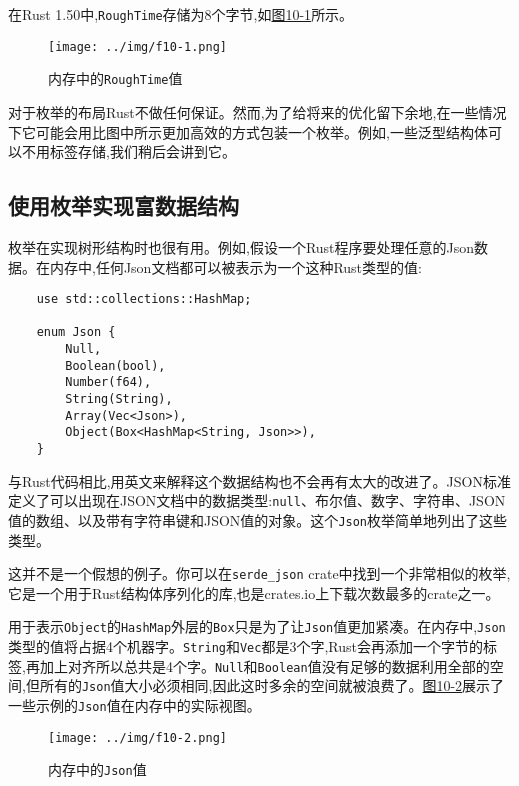 在Rust 1.50中,\texttt{RoughTime}存储为8个字节,如\hyperref[f10-1]{图10-1}所示。

\begin{figure}[htbp]
    \centering
    \texttt{[image: ../img/f10-1.png]}
    \caption{内存中的\texttt{RoughTime}值}
    \label{f10-1}
\end{figure}

对于枚举的布局Rust不做任何保证。然而,为了给将来的优化留下余地,在一些情况下它可能会用比图中所示更加高效的方式包装一个枚举。例如,一些泛型结构体可以不用标签存储,我们稍后会讲到它。

\subsection{使用枚举实现富数据结构}

枚举在实现树形结构时也很有用。例如,假设一个Rust程序要处理任意的Json数据。在内存中,任何Json文档都可以被表示为一个这种Rust类型的值:
\begin{verbatim}
    use std::collections::HashMap;

    enum Json {
        Null,
        Boolean(bool),
        Number(f64),
        String(String),
        Array(Vec<Json>),
        Object(Box<HashMap<String, Json>>),
    }
\end{verbatim}

与Rust代码相比,用英文来解释这个数据结构也不会再有太大的改进了。JSON标准定义了可以出现在JSON文档中的数据类型:\texttt{null}、布尔值、数字、字符串、JSON值的数组、以及带有字符串键和JSON值的对象。这个\texttt{Json}枚举简单地列出了这些类型。

这并不是一个假想的例子。你可以在\texttt{serde\_json} crate中找到一个非常相似的枚举,它是一个用于Rust结构体序列化的库,也是crates.io上下载次数最多的crate之一。

用于表示\texttt{Object}的\texttt{HashMap}外层的\texttt{Box}只是为了让\texttt{Json}值更加紧凑。在内存中,\texttt{Json}类型的值将占据4个机器字。\texttt{String}和\texttt{Vec}都是3个字,Rust会再添加一个字节的标签,再加上对齐所以总共是4个字。\texttt{Null}和\texttt{Boolean}值没有足够的数据利用全部的空间,但所有的\texttt{Json}值大小必须相同,因此这时多余的空间就被浪费了。\hyperref[f10-2]{图10-2}展示了一些示例的\texttt{Json}值在内存中的实际视图。

\begin{figure}[htbp]
    \centering
    \texttt{[image: ../img/f10-2.png]}
    \caption{内存中的\texttt{Json}值}
    \label{f10-2}
\end{figure}

